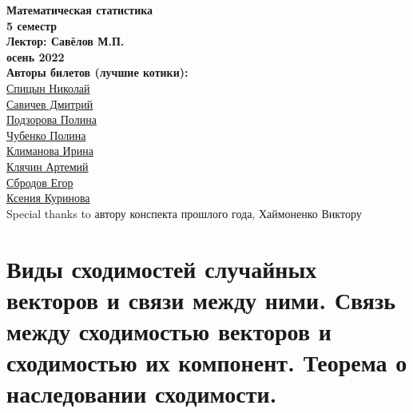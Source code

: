 


    \thispagestyle{empty}
    \BgThispage
    \begin{center}
        \vspace*{4cm}
        
        \Huge
        \textbf{Математическая статистика } \\
        \textbf{5 семестр} \\
        \textbf{Лектор: Савёлов М.П.} \\
        \textbf{осень 2022} \\
        
        \vspace{7cm}
        \Large
        \textbf{Авторы билетов (лучшие котики):} \\
        \href{https://vk.com/spitsynn}{Спицын Николай} \\
        \href{https://vk.com/dimasav123}{Савичев Дмитрий} \\
        \href{https://vk.com/id165779384}{Подзорова Полина} \\
        \href{https://vk.com/poli.dobro}{Чубенко Полина} \\        
        \href{https://vk.com/meraklim}{Климанова Ирина} \\
        \href{https://vk.com/artemiy.kliachin}{Клячин Артемий} \\
        \href{https://vk.com/ulegor}{Сбродов Егор} \\
        \href{https://vk.com/ksinomorph}{Ксения Куринова} \\
        Special thanks to автору конспекта прошлого года, Хаймоненко Виктору
        
    \end{center}

\newpage

\tableofcontents
\newpage


\section{Виды сходимостей случайных векторов и связи между ними. Связь между сходимостью векторов и сходимостью их компонент. Теорема о наследовании сходимости.}


